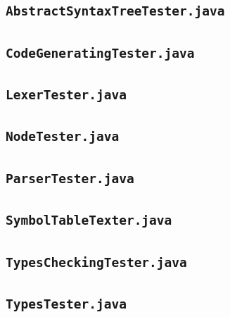 \documentclass{book}
\begin{document}
\subsection{\texttt{AbstractSyntaxTreeTester.java}}



\subsection{\texttt{CodeGeneratingTester.java}}

\subsection{\texttt{LexerTester.java}}

\subsection{\texttt{NodeTester.java}}

\subsection{\texttt{ParserTester.java}}

\subsection{\texttt{SymbolTableTexter.java}}

\subsection{\texttt{TypesCheckingTester.java}}

\subsection{\texttt{TypesTester.java}}



\nocite{*}


\end{document}

